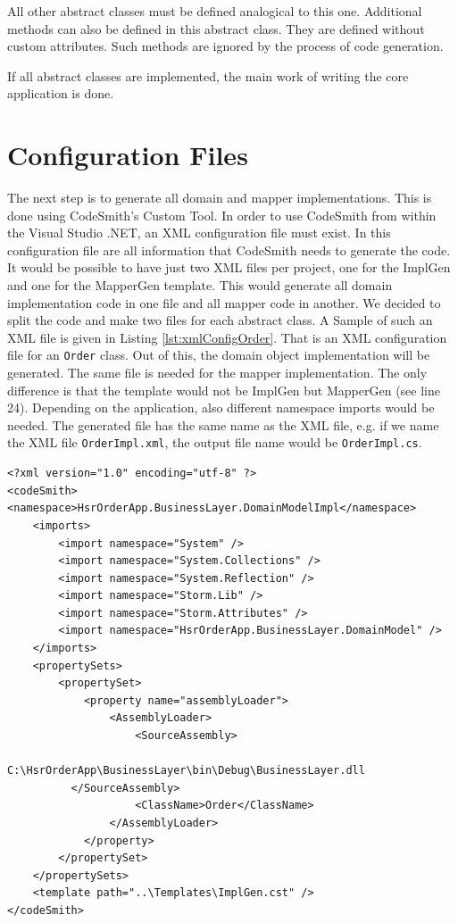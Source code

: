 		All other abstract classes must be defined analogical to this one. Additional
		methods can also be defined in this abstract class. They are defined without
		custom attributes. Such methods are ignored by the process of code
		generation.
		
		If all abstract classes are implemented, the main work of writing the core
		application is done.		
		
	\section{Configuration Files}
		The next step is to generate all domain and mapper implementations. This is done using 
		CodeSmith's Custom Tool. In order to use CodeSmith from within the Visual Studio .NET, 
		an XML configuration file must exist. In this configuration file are all information
		that CodeSmith needs to generate the code. It would be possible to have just
		two XML files per project, one for the ImplGen and one for the MapperGen template. This
		would generate all domain implementation code in one file and all mapper code in another.
		We decided to split the code and make two files for each abstract class.
		A Sample of such an XML file is given in Listing \ref{lst:xmlConfigOrder}. That is an
		XML configuration file for an \verb~Order~ class. Out of this, the domain object
		implementation will be generated. The same file is needed for the mapper
		implementation. The only difference is that the template would not be ImplGen but
		MapperGen (see line 24). Depending on the application, also different namespace
		imports would be needed. The generated file has the same name as the
		XML file, e.g. if we name the XML file \verb~OrderImpl.xml~, the output file name
		would be \verb~OrderImpl.cs~.
		
		\begin{lstlisting}[float=htb,language={[Sharp]C},caption=CodeSmith Configuration File,
		label=lst:xmlConfigOrder]
<?xml version="1.0" encoding="utf-8" ?> 
<codeSmith>
<namespace>HsrOrderApp.BusinessLayer.DomainModelImpl</namespace>
	<imports>
		<import namespace="System" />
		<import namespace="System.Collections" />
		<import namespace="System.Reflection" />
		<import namespace="Storm.Lib" />
		<import namespace="Storm.Attributes" />
		<import namespace="HsrOrderApp.BusinessLayer.DomainModel" />
	</imports>
	<propertySets>
		<propertySet>
			<property name="assemblyLoader">
				<AssemblyLoader>
					<SourceAssembly>
						C:\HsrOrderApp\BusinessLayer\bin\Debug\BusinessLayer.dll
          </SourceAssembly>
					<ClassName>Order</ClassName>
				</AssemblyLoader>
			</property>
		</propertySet>
	</propertySets>
	<template path="..\Templates\ImplGen.cst" />
</codeSmith>
		\end{lstlisting}
				
